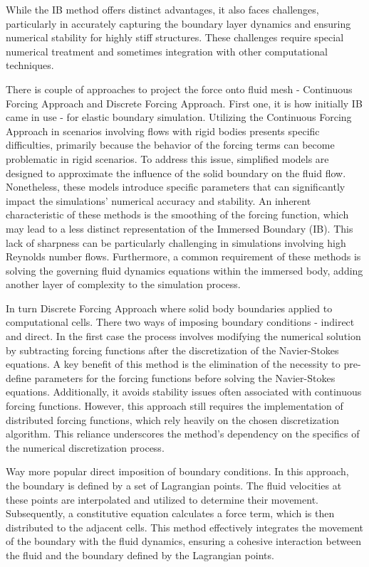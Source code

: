 While the IB method offers distinct advantages, it also faces challenges, particularly in accurately capturing the boundary layer dynamics and ensuring numerical stability for highly stiff structures. These challenges require special numerical treatment and sometimes integration with other computational techniques. 

There is couple of approaches to project the force onto fluid mesh - Continuous Forcing Approach and Discrete Forcing Approach. First one, it is how initially IB came in use - for elastic boundary simulation. Utilizing the Continuous Forcing Approach in scenarios involving flows with rigid bodies presents specific difficulties, primarily because the behavior of the forcing terms can become problematic in rigid scenarios. To address this issue, simplified models are designed to approximate the influence of the solid boundary on the fluid flow. Nonetheless, these models introduce specific parameters that can significantly impact the simulations' numerical accuracy and stability. An inherent characteristic of these methods is the smoothing of the forcing function, which may lead to a less distinct representation of the Immersed Boundary (IB). This lack of sharpness can be particularly challenging in simulations involving high Reynolds number flows. Furthermore, a common requirement of these methods is solving the governing fluid dynamics equations within the immersed body, adding another layer of complexity to the simulation process. 

In turn Discrete Forcing Approach where solid body boundaries applied to computational cells. There two ways of imposing boundary conditions - indirect and direct. In the first case the process involves modifying the numerical solution by subtracting forcing functions after the discretization of the Navier-Stokes equations. A key benefit of this method is the elimination of the necessity to pre-define parameters for the forcing functions before solving the Navier-Stokes equations. Additionally, it avoids stability issues often associated with continuous forcing functions. However, this approach still requires the implementation of distributed forcing functions, which rely heavily on the chosen discretization algorithm. This reliance underscores the method's dependency on the specifics of the numerical discretization process.

Way more popular direct imposition of boundary conditions. In this approach, the boundary is defined by a set of Lagrangian points. The fluid velocities at these points are interpolated and utilized to determine their movement. Subsequently, a constitutive equation calculates a force term, which is then distributed to the adjacent cells. This method effectively integrates the movement of the boundary with the fluid dynamics, ensuring a cohesive interaction between the fluid and the boundary defined by the Lagrangian points. 

